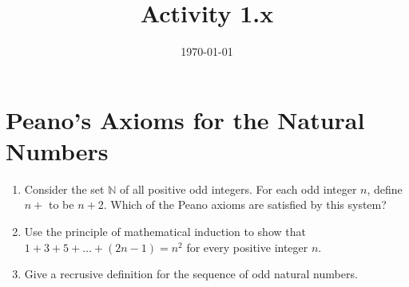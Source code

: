 \documentclass[12pt]{amsart}
\title{Activity 1.x}
\date{\today}
\begin{document}
\maketitle
\part*{Peano's Axioms for the Natural Numbers}
\begin{enumerate}
\item Consider the set $\mathbb{N}$ of all positive odd integers. For each odd integer $n$, define $n+$ to be $n+$2. Which of the Peano axioms are satisfied by this system?
\item Use the principle of mathematical induction to show that $1 + 3 + 5 + \ldots + (2n-1) = n^2$ for every positive integer $n$.
\item Give a recrusive definition for the sequence of odd natural numbers.
\end{enumerate}
\end{document}
